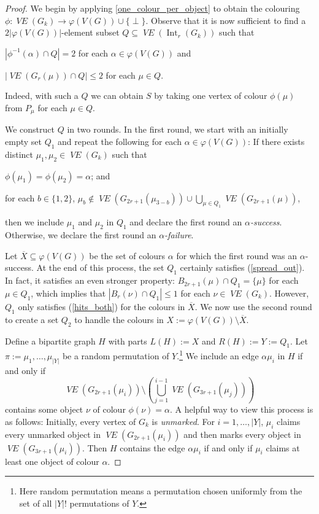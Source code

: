 \documentclass{patmorin}
\DeclareMathOperator{\interior}{Int}
\newcommand{\defin}[1]{\emph{\color{brightmaroon}#1}}
\DeclareMathOperator{\VE}{\mathit{VE}}
\begin{document}
\begin{proof}
  We begin by applying \cref{one_colour_per_object} to obtain the colouring $\phi:\VE(G_k)\to\varphi(V(G))\cup\{\perp\}$.  Observe that it is now sufficient to find a $2|\varphi(V(G))|$-element subset $Q\subseteq\VE(\interior_r(G_k))$ such that
  \begin{compactenum}[(i)]
    \item $|\phi^{-1}(\alpha)\cap Q|= 2$ for each $\alpha\in\varphi(V(G))$ and
    \item $|\VE(G_r(\mu))\cap Q|\le 2$ for each $\mu\in Q$.
  \end{compactenum}
  Indeed, with such a $Q$ we can obtain $S$ by taking one vertex of colour $\phi(\mu)$ from $P_\mu$ for each $\mu\in Q$.

  We construct $Q$ in two rounds.  In the first round, we start with an initially empty set $Q_1$ and repeat the following for each $\alpha\in\varphi(V(G))$:
  If there exists distinct $\mu_1,\mu_2\in\VE(G_k)$ such that
  \begin{compactenum}[(a)]
    \item $\phi(\mu_1)=\phi(\mu_2)=\alpha$; and\label{hits_both_q}
    \item for each $b\in\{1,2\}$, $\mu_b\not\in \VE(G_{2r+1}(\mu_{3-b})) \cup \bigcup_{\mu\in Q_1} \VE(G_{2r+1}(\mu))$,\label{spread_out_q}
  \end{compactenum}
  then we include $\mu_1$ and $\mu_2$ in $Q_1$ and declare the first round an \defin{$\alpha$-success}.  Otherwise, we declare the first round an \defin{$\alpha$-failure}.

  Let $\overline{X}\subseteq\varphi(V(G))$ be the set of colours $\alpha$ for which the first round was an $\alpha$-success. At the end of this process, the set $Q_1$ certainly satisfies (\ref{spread_out}).  In fact, it satisfies an even stronger property: $B_{2r+1}(\mu)\cap Q_1=\{\mu\}$ for each $\mu\in Q_1$, which implies that $|B_r(\nu)\cap Q_1|\le 1$ for each $\nu\in\VE(G_k)$. However, $Q_1$ only satisfies (\ref{hits_both}) for the colours in $\overline{X}$.  We now use the second round to create a set $Q_2$ to handle the colours in $X:=\varphi(V(G))\setminus \overline{X}$.

  Define a bipartite graph $H$ with parts $L(H):=X$ and $R(H):=Y:=Q_1$.  Let $\pi:=\mu_1,\ldots,\mu_{|Y|}$ be a random permutation of $Y$.\footnote{Here random permutation means a permutation chosen uniformly from the set of all $|Y|!$ permutations of $Y$.}  We include an edge $\alpha\mu_i$ in $H$ if and only if
  \[
    \VE(G_{2r+1}(\mu_i))\setminus\left(\bigcup_{j=1}^{i-1}\VE(G_{3r+1}(\mu_j))\right)
  \]
  contains some object $\nu$ of colour $\phi(\nu)=\alpha$.  A helpful way to view this process is as follows: Initially, every vertex of $G_k$ is \defin{unmarked}.  For $i=1,\ldots,|Y|$, $\mu_i$ claims every unmarked object in $\VE(G_{2r+1}(\mu_i))$ and then marks every object in $\VE(G_{3r+1}(\mu_i))$. Then $H$ contains the edge $\alpha\mu_i$ if and only if $\mu_i$ claims at least one object of colour $\alpha$.


\end{proof}
\end{document}
